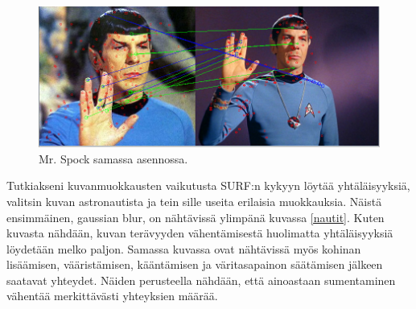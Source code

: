\documentclass[12pt,a4paper,titlepage]{article}
\begin{document}
\begin{figure}
\centering 
\includegraphics[width=\textwidth]{kuvat/spock.jpg}
\caption{Mr. Spock samassa asennossa.}
\label{spock}
\end{figure}

Tutkiakseni kuvanmuokkausten vaikutusta SURF:n kykyyn löytää yhtäläisyyksiä, valitsin kuvan astronautista ja tein sille useita erilaisia muokkauksia. Näistä ensimmäinen, gaussian blur, on nähtävissä ylimpänä kuvassa \ref{nautit}. Kuten kuvasta nähdään, kuvan terävyyden vähentämisestä huolimatta yhtäläisyyksiä löydetään melko paljon. Samassa kuvassa ovat nähtävissä myös kohinan lisäämisen, vääristämisen, kääntämisen ja väritasapainon säätämisen jälkeen saatavat yhteydet. Näiden perusteella nähdään, että ainoastaan sumentaminen vähentää merkittävästi yhteyksien määrää.
\end{document}
